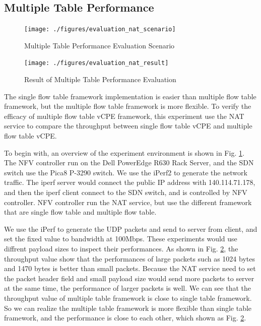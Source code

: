 \documentclass[journal]{IEEEtran}
\begin{document}
\subsection{Multiple Table Performance}

\begin{figure}[!t]
\centering
\texttt{[image: ./figures/evaluation\_nat\_scenario]}
\caption{Multiple Table Performance Evaluation Scenario}
\label{fig:evaluation_nat_scenario}
\end{figure}

\begin{figure}[!t]
\centering
\texttt{[image: ./figures/evaluation\_nat\_result]}
\caption{Result of Multiple Table Performance Evaluation}
\label{fig:evaluation_nat_result}
\end{figure}

The single flow table framework implementation is easier than multiple flow table framework,
but the multiple flow table framework is more flexible.
To verify the efficacy of multiple flow table vCPE framework,
this experiment use the NAT service to compare the throughput between single flow table vCPE and multiple flow table vCPE.

To begin with, an overview of the experiment environment is shown in Fig. \ref{fig:evaluation_nat_scenario}.
The NFV controller run on the Dell PowerEdge R630 Rack Server,
and the SDN switch use the Pica8 P-3290 switch\cite{pica8-switch}.
We use the iPerf2\cite{iperf} to generate the network traffic.
The iperf server would connect the public IP address with 140.114.71.178, and then the iperf client connect to the SDN switch, and is controlled by NFV controller.
NFV controller run the NAT service, but use the different framework that are single flow table and multiple flow table.

We use the iPerf to generate the UDP packets and send to server from client, and set the fixed value to bandwidth at 100Mbps. These experiments would use diffrent payload sizes to inspect their performances.
As shown in Fig. \ref{fig:evaluation_nat_result}, the throughput value show that the performances of large packets such as 1024 bytes and 1470 bytes is better than small packets. Because the NAT service need to set the packet header field and small payload size would send more packets to server at the same time, the performance of larger packets is well. We can see that the throughput value of multiple table framework is close to single table framework. So we can realize the multiple table framework is more flexible than single table framework, and the performance is close to each other, which shown as Fig. \ref{fig:evaluation_nat_result}.
\end{document}
